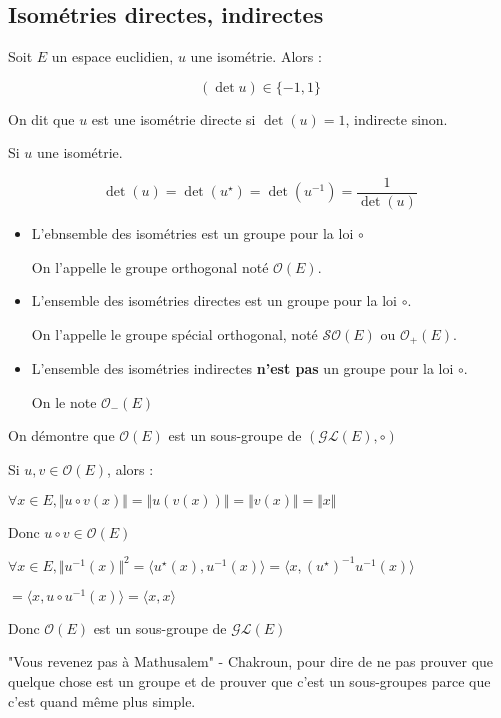 \documentclass[a4paper,12pt]{book}
\newcommand{\Prop}[2]{\begin{tcolorbox}[sharp corners, colback=white,colframe=red!90!black!75, title=Proposition : #1]#2\end{tcolorbox}}
\newcommand{\Pre}[1]{\begin{tcolorbox}[sharp corners, colback=white,colframe=green!60!green!30!black!75, title=Preuve]#1\end{tcolorbox}}
\begin{document}
\subsection{Isométries directes, indirectes}
\Prop{}{Soit $E$ un espace euclidien, $u$ une isométrie. Alors :
\par $$(\det u)\in \{-1, 1\}$$
\par On dit que $u$ est une isométrie directe si $\det(u)=1$, indirecte sinon.}
\Pre{Si $u$ une isométrie.
\par $$\det(u)=\det(u^\star)=\det(u^{-1})=\frac{1}{\det(u)}$$}
\Prop{}{\begin{itemize}
\item L'ebnsemble des isométries est un groupe pour la loi $\circ$
\par On l'appelle le groupe orthogonal noté $\mathcal{O}(E)$.
\item L'ensemble des isométries directes est un groupe pour la loi $\circ$.
\par On l'appelle le groupe spécial orthogonal, noté $\mathcal{SO}(E)$ ou $\mathcal{O}_+(E)$.
\item L'ensemble des isométries indirectes \textbf{n'est pas} un groupe pour la loi $\circ$.
\par On le note $\mathcal{O}_-(E)$
\end{itemize}}
\Pre{On démontre que $\mathcal{O}(E)$ est un sous-groupe de $(\mathcal{GL}(E),\circ)$
\par Si $u,v\in\mathcal{O}(E)$, alors :
\par $\forall x\in E, \Vert u\circ v(x)\Vert = \Vert u(v(x))\Vert = \Vert v(x)\Vert = \Vert x\Vert$
\par Donc $u\circ v\in\mathcal{O}(E)$
\par $\forall x\in E, \Vert u^{-1}(x)\Vert^2 = \langle u^\star(x), u^{-1}(x)\rangle =\langle x, (u^\star)^{-1}u^{-1}(x) \rangle$
\par $= \langle x, u\circ u^{-1}(x)\rangle = \langle x,x\rangle$
\par Donc $\mathcal{O}(E)$ est un sous-groupe de $\mathcal{GL}(E)$}
"Vous revenez pas à Mathusalem" - Chakroun, pour dire de ne pas prouver que quelque chose est un groupe et de prouver que c'est un sous-groupes parce que c'est quand même plus simple.
\end{document}
